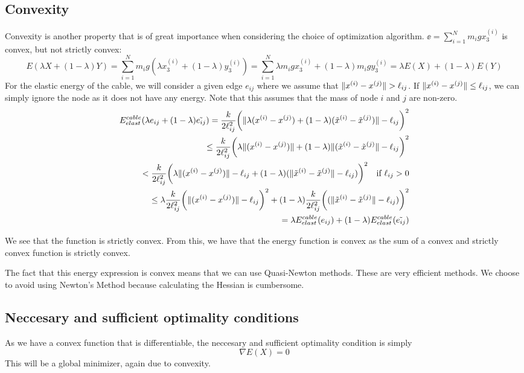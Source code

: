 \subsection{Convexity}

Convexity is another property that is of great importance when considering the choice of optimization algorithm.  $\ee =\sum_{i=1}^N m_i g x_3^{(i)}$ is convex, but not strictly convex:
\begin{equation*}
    E(\lambda X +(1-\lambda) Y) = \sum_{i=1}^N m_i g (\lambda x_3^{(i)} + (1-\lambda) y_3^{(i)})
    =\sum_{i=1}^N \lambda m_i g x_3^{(i)} + (1-\lambda) m_i g  y_3^{(i)} = \lambda E(X) + (1-\lambda) E(Y)
\end{equation*}
For the elastic energy of the cable, we will consider a given edge $e_{ij}$ where we assume that $\lVert x^{(i)} - x^{(j)}\rVert > \ell_{ij}$. If $\lVert x^{(i)} - x^{(j)}\rVert \leq \ell_{ij}$, we can simply ignore the node as it does not have any energy. Note that this assumes that the mass of node $i$ and $j$ are non-zero.
\begin{align*}
     E^{cable}_{elast}(\lambda e_{ij} + (1-\lambda) \tilde{e_{ij}}) = \frac{k}{2 \ell_{ij}^2} \bigg( \lVert \lambda(x^{(i)}-x^{(j)}) + ( 1-\lambda ) (\tilde{x}^{(i)}-\tilde{x}^{(j)} )\rVert -\ell_{ij}\bigg)^2\\ \leq \frac{k}{2 \ell_{ij}^2} \bigg( \lambda \lVert (x^{(i)}-x^{(j)}) \rVert +( 1-\lambda ) \lVert (\tilde{x}^{(i)}-\tilde{x}^{(j)} \rVert -\ell_{ij}\bigg)^2 \\ <
     \frac{k}{2 \ell_{ij}^2}\bigg( \lambda\lVert  (x^{(i)}-x^{(j)}) \rVert - \ell_{ij} +( 1-\lambda ) ( \lVert \tilde{x}^{(i)}-\tilde{x}^{(j)} \rVert -\ell_{ij} ) \bigg)^2 \quad \text{if $\ell_{ij} > 0$} \\
     \leq \lambda \frac{k}{2 \ell_{ij}^2}\bigg( \lVert  (x^{(i)}-x^{(j)}) \rVert - \ell_{ij} \bigg)^2 + ( 1-\lambda )\frac{k}{2 \ell_{ij}^2}\bigg( ( \lVert \tilde{x}^{(i)}-\tilde{x}^{(j)} \rVert -\ell_{ij} ) \bigg)^2 \\= \lambda E^{cable}_{elast}(e_{ij}) + (1-\lambda) E^{cable}_{elast}(\Tilde{e_{ij}})
\end{align*}

We see that the function is strictly convex. From this, we have that the energy function is convex as the sum of a convex and strictly convex function is strictly convex. 

The fact that this energy expression is convex means that we can use Quasi-Newton methods. These are very efficient methods. We choose to avoid using Newton's Method because calculating the Hessian is cumbersome.

\subsection{Neccesary and sufficient optimality conditions}
As we have a convex function that is differentiable, the neccesary and sufficient optimality condition is simply \begin{equation}
    \nabla E(X) = 0
\end{equation}
This will be a global minimizer, again due to convexity.